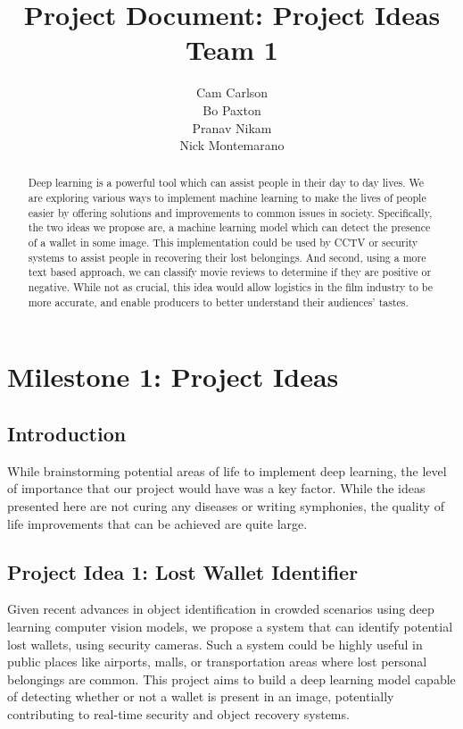 \documentclass{report}
\title{Project Document: Project Ideas  \\ Team 1
}
\author{Cam Carlson \\
Bo Paxton\\
Pranav Nikam\\
Nick Montemarano}
\date{}
\begin{document}
\maketitle

\tableofcontents

\begin{abstract}
Deep learning is a powerful tool which can assist people in their day to day lives. We are exploring various ways to implement machine learning to make the lives of people easier by offering solutions and improvements to common issues in society. Specifically, the two ideas we propose are, a machine learning model which can detect the presence of a wallet in some image. This implementation could be used by CCTV or security systems to assist people in recovering their lost belongings. And second, using a more text based approach, we can classify movie reviews to determine if they are positive or negative. While not as crucial, this idea would allow logistics in the film industry to be more accurate, and enable producers to better understand their audiences' tastes. 

\end{abstract}

\chapter{Milestone 1: Project Ideas}

\section{Introduction}

While brainstorming potential areas of life to implement deep learning, the level of importance that our project would have was a key factor. While the ideas presented here are not curing any diseases or writing symphonies, the quality of life improvements that can be achieved are quite large. 

\section{Project Idea 1: Lost Wallet Identifier}

Given recent advances in object identification in crowded scenarios using deep learning computer vision models, we propose a system that can identify potential lost wallets,  using security cameras. Such a system could be highly useful in public places like airports, malls, or transportation areas where lost personal belongings are common. This project aims to build a deep learning model capable of detecting whether or not a wallet is present in an image, potentially contributing to real-time security and object recovery systems.
\end{document}
